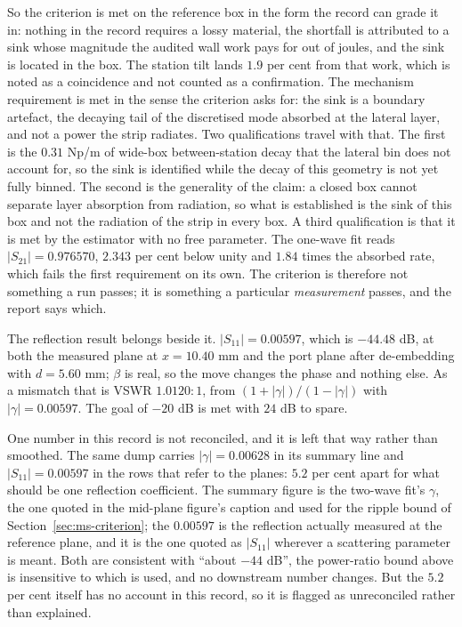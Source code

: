 So the criterion is met on the reference box in the form the record can grade it in: nothing in the record
requires a lossy material, the shortfall is attributed to a sink whose magnitude the audited wall work pays for
out of joules, and the sink is located in the box. The station tilt lands $1.9$ per cent from that work, which is
noted as a coincidence and not counted as a confirmation. The mechanism requirement is met in the sense the
criterion asks for: the sink is a boundary artefact, the decaying tail of the discretised mode absorbed at the
lateral layer, and not a power the strip radiates. Two qualifications travel with that. The first is the
$0.31$ Np/m of wide-box between-station decay that the lateral bin does not account for, so the sink is
identified while the decay of this geometry is not yet fully binned. The second is the generality of the claim:
a closed box cannot separate layer absorption from radiation, so what is established is the sink of this box and
not the radiation of the strip in every box. A third qualification
is that it is met by the estimator with no free parameter. The one-wave fit reads $|S_{21}| = 0.976570$, $2.343$
per cent below unity and $1.84$ times the absorbed rate, which fails the first requirement on its own. The criterion is
therefore not something a run passes; it is something a particular \emph{measurement} passes, and the report says
which.

The reflection result belongs beside it. $|S_{11}| = 0.00597$, which is $-44.48$ dB, at both the measured plane at
$x = 10.40$ mm and the port plane after de-embedding with $d = 5.60$ mm; $\beta$ is real, so the move changes the
phase and nothing else. As a mismatch that is VSWR $1.0120 : 1$, from $(1+|\gamma|)/(1-|\gamma|)$ with
$|\gamma| = 0.00597$. The goal of $-20$ dB is met with $24$ dB to spare.

One number in this record is not reconciled, and it is left that way rather than smoothed. The same dump carries
$|\gamma| = 0.00628$ in its summary line and $|S_{11}| = 0.00597$ in the rows that refer to the planes: $5.2$ per
cent apart for what should be one reflection coefficient. The summary figure is the two-wave fit's $\gamma$, the
one quoted in the mid-plane figure's caption and used for the ripple bound of Section~\ref{sec:ms-criterion}; the
$0.00597$ is the reflection actually measured at the reference plane, and it is the one quoted as $|S_{11}|$
wherever a scattering parameter is meant. Both are consistent with ``about $-44$ dB'', the power-ratio bound
above is insensitive to which is used, and no downstream number changes. But the $5.2$ per cent itself has no
account in this record, so it is flagged as unreconciled rather than explained.


